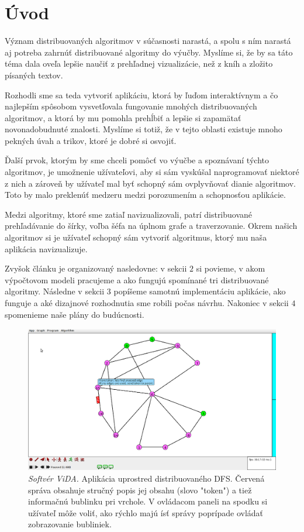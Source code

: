 \section{Úvod}

Význam distribuovaných algoritmov v súčasnosti narastá, a spolu s ním narastá aj potreba
zahrnúť distribuované algoritmy do výučby. Myslíme si, že by sa táto téma dala oveľa lepšie naučiť
z prehľadnej vizualizácie, než z kníh a zložito písaných textov.

Rozhodli sme sa teda vytvoriť aplikáciu, ktorá by ľuďom interaktívnym a čo najlepším spôsobom
vysvetľovala fungovanie mnohých distribuovaných algoritmov, a ktorá by mu pomohla prehĺbiť a lepšie si zapamätať
novonadobudnuté znalosti. Myslíme si totiž, že v tejto oblasti existuje mnoho pekných úvah a trikov,
ktoré je dobré si osvojiť. 

Ďalší prvok, ktorým by sme chceli pomôcť vo výučbe a spoznávaní týchto algoritmov, je umožnenie užívateľovi, 
aby si sám vyskúšal naprogramovať niektoré z nich a zároveň by užívateľ mal byť schopný sám
ovplyvňovať dianie algoritmov. Toto by malo preklenúť medzeru medzi porozumením a schopnosťou
aplikácie.

Medzi algoritmy, ktoré sme zatiaľ navizualizovali, patrí distribuované prehľadávanie do šírky,
voľba šéfa na úplnom grafe a traverzovanie. Okrem našich algoritmov si je užívateľ schopný
sám vytvoriť algoritmus, ktorý mu naša aplikácia navizualizuje.

Zvyšok článku je organizovaný nasledovne: v sekcii $2$ si povieme, v akom výpočtovom modeli
pracujeme a ako fungujú spomínané tri distribuované algoritmy. 
Následne v sekcii $3$ popíšeme samotnú implementáciu aplikácie, ako
funguje a aké dizajnové rozhodnutia sme robili počas návrhu. Nakoniec v sekcii $4$ spomenieme naše plány do budúcnosti.

\noindent
\begin{figure}
\centering
\includegraphics[width=2.01\columnwidth]{DFS.png}
\caption{\emph{Softvér ViDA.} Aplikácia uprostred distribuovaného DFS. 
Červená správa obsahuje stručný popis jej obsahu (slovo "token") a tiež informačnú
bublinku pri vrchole. V ovládacom paneli na spodku si užívateľ môže voliť, ako rýchlo majú ísť
správy poprípade ovládať zobrazovanie bubliniek.}
\label{img:historia} 
\end{figure}
